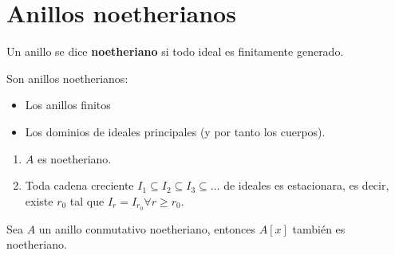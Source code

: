 \documentclass[twoside]{report}
\begin{document}
\section{Anillos noetherianos}
\begin{defi}
Un anillo se dice \textbf{noetheriano} si todo ideal es finitamente generado.
\end{defi}
\begin{prop}
Son anillos noetherianos:
\begin{itemize}
\item Los anillos finitos
\item Los dominios de ideales principales (y por tanto los cuerpos).
\end{itemize}
\end{prop}
\begin{prop}\mbox{}
\begin{enumerate}
	\item $A$ es noetheriano.
	\item Toda cadena creciente $I_1 \subseteq I_2 \subseteq I_3 \subseteq \dots$ de ideales es estacionara, es decir, existe $r_0$ tal que $I_r = I_{r_0} \forall r \geq r_0$.
\end{enumerate}
\end{prop}
\begin{teorema} Sea $A$ un anillo conmutativo noetheriano, entonces $A[x]$ también es noetheriano.
\end{teorema}
\end{document}
